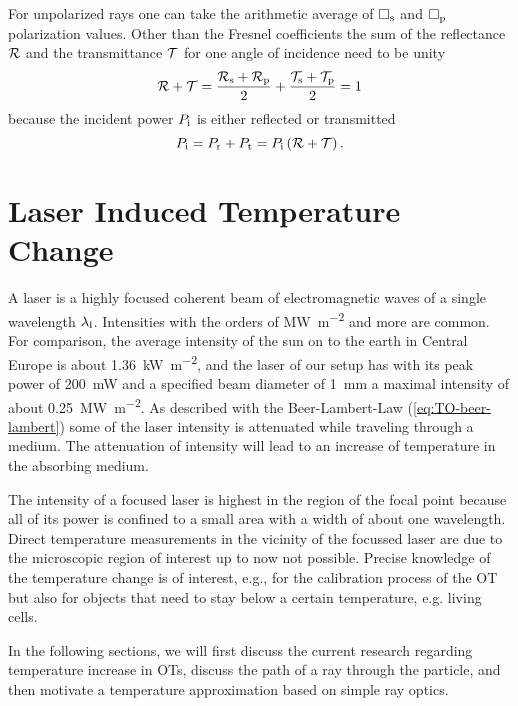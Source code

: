For unpolarized rays one can take the arithmetic average of $\Box_{\mathrm{s}}$ and 
$\Box_{\mathrm{p}}$ polarization values. Other than the Fresnel coefficients the 
sum of the reflectance $\mathcal{R}$ and the transmittance $\mathcal{T}$ for one 
angle of incidence need to be unity
\begin{equation}
  \mathcal{R} + \mathcal{T} = 
  \frac{\mathcal{R}_{\mathrm{s}}+\mathcal{R}_{\mathrm{p}}}{2} +
  \frac{\mathcal{T}_{\mathrm{s}}+\mathcal{T}_{\mathrm{p}}}{2} = 1 
  \label{eq:TO-fresnel}
\end{equation}
because the incident power $P_{\mathrm{i}}$ is either reflected or transmitted
\begin{equation}
  P_{\mathrm{i}} = P_{\mathrm{r}} + P_{\mathrm{t}} = P_{\mathrm{i}}\left( \mathcal{R} + \mathcal{T} 
  \right).
\end{equation}

\section{Laser Induced Temperature Change\label{sec:TO-temperature}}

A laser is a highly focused coherent beam of electromagnetic waves of a single 
wavelength $\lambda_{\mathrm{l}}$. Intensities with the orders of 
\si{\mega\watt\per\square\meter} and more are common. For comparison, the 
average intensity of the sun on to the earth in Central Europe is about 
\SI{1.36}{\kilo\watt\per\square\meter}, and the laser of our setup has with its 
peak power of \SI{200}{\milli\watt} and a specified beam diameter of 
\SI{1}{\mm} a maximal intensity of about 
\SI{0.25}{\mega\watt\per\square\meter}. As described with the Beer-Lambert-Law
(\cref{eq:TO-beer-lambert}) some of the laser intensity is attenuated while 
traveling through a medium. The attenuation of intensity will lead to an 
increase of temperature in the absorbing medium.

The intensity of a focused laser is highest in the region of the focal point 
because all of its power is confined to a small area with a width of about one 
wavelength. Direct temperature measurements in the vicinity of the focussed 
laser are due to the microscopic region of interest up to now not possible. 
Precise knowledge of the temperature change is of interest, e.g., for the 
calibration process of the OT but also for objects that need to stay below a 
certain temperature, e.g. living cells.

In the following sections, we will first discuss the current research regarding 
temperature increase in OTs, discuss the path of a ray through the particle, 
and then motivate a temperature approximation based on simple ray optics.

